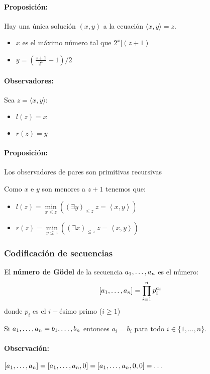 \paragraph{Proposición:} Hay una única solución $(x,y)$ a la ecuación $\langle x,y \rangle = z$.
	\begin{itemize}
		\item $x$ es el máximo número tal que $2^x | (z+1)$
		\item $y = (\frac{z+1}{2^x} - 1)/2$
	\end{itemize}

\paragraph{Observadores:} Sea $z = \langle x,y \rangle$:
\begin{itemize}
	\item $l(z) = x$
	\item $r(z) = y$
\end{itemize}

\paragraph{Proposición:} Los observadores de pares son primitivas recursivas
\begin{demo}
	Como $x$ e $y$ son menores a $z +1$ tenemos que:
	\begin{itemize}
		\item $l(z) = \min\limits_{x\leq z} \left(\left(\exists y\right)_{\leq z}~ z = \left\langle x,y\right\rangle\right)$
		\item $r(z) = \min\limits_{y\leq z} \left(\left(\exists x\right)_{\leq z}~ z = \left\langle x,y\right\rangle\right)$
	\end{itemize}
\end{demo}

\subsubsection{Codificación de secuencias}
El \textbf{número de Gödel} de la secuencia $a_1,\dots, a_{n}$ es el número:
$$[a_1,\dots, a_{n}] = \prod_{i=1}^{n} p_i^{a_i}$$
donde $p_i$ es el $i-$ésimo primo ($i\geq 1$)

\begin{teorema}
Si $a_1,\dots, a_{n} = b_1,\dots, b_{n}$ entonces $a_i = b_i$ para todo $i\in\{1,\dots,n\}$.
\end{teorema}

\paragraph{Observación:} $[a_1,\dots, a_{n}] = [a_1,\dots, a_{n},0] = [a_1,\dots, a_{n},0,0]= \dots$

